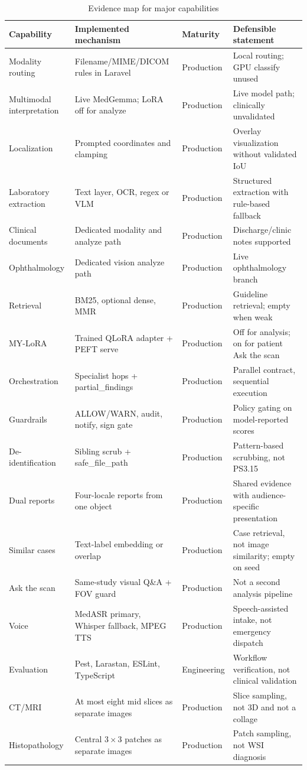 \documentclass[conference]{IEEEtran}
\begin{document}
\begin{table}[t]
\caption{Evidence map for major capabilities}
\label{tab:maturity}
\centering
\scriptsize
\begin{tabular}{p{}p{}p{}p{}}
\toprule
Capability & Implemented mechanism & Maturity & Defensible statement \\
\midrule
Modality routing & Filename/MIME/DICOM rules in Laravel & Production & Local routing; GPU classify unused \\
Multimodal interpretation & Live MedGemma; LoRA off for analyze & Production & Live model path; clinically unvalidated \\
Localization & Prompted coordinates and clamping & Production & Overlay visualization without validated IoU \\
Laboratory extraction & Text layer, OCR, regex or VLM & Production & Structured extraction with rule-based fallback \\
Clinical documents & Dedicated modality and analyze path & Production & Discharge/clinic notes supported \\
Ophthalmology & Dedicated vision analyze path & Production & Live ophthalmology branch \\
Retrieval & BM25, optional dense, MMR & Production & Guideline retrieval; empty when weak \\
MY-LoRA & Trained QLoRA adapter + PEFT serve & Production & Off for analysis; on for patient Ask the scan \\
Orchestration & Specialist hops + partial\_findings & Production & Parallel contract, sequential execution \\
Guardrails & ALLOW/WARN, audit, notify, sign gate & Production & Policy gating on model-reported scores \\
De-identification & Sibling scrub + safe\_file\_path & Production & Pattern-based scrubbing, not PS3.15 \\
Dual reports & Four-locale reports from one object & Production & Shared evidence with audience-specific presentation \\
Similar cases & Text-label embedding or overlap & Production & Case retrieval, not image similarity; empty on seed \\
Ask the scan & Same-study visual Q\&A + FOV guard & Production & Not a second analysis pipeline \\
Voice & MedASR primary, Whisper fallback, MPEG TTS & Production & Speech-assisted intake, not emergency dispatch \\
Evaluation & Pest, Larastan, ESLint, TypeScript & Engineering & Workflow verification, not clinical validation \\
CT/MRI & At most eight mid slices as separate images & Production & Slice sampling, not 3D and not a collage \\
Histopathology & Central \(3\times3\) patches as separate images & Production & Patch sampling, not WSI diagnosis \\
\bottomrule
\end{tabular}
\end{table}
\end{document}
